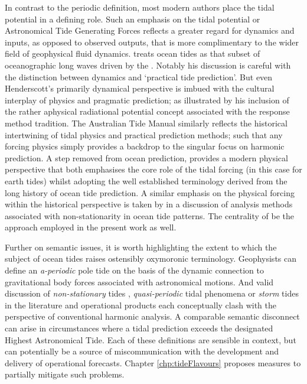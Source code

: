 In contrast to the periodic definition, most modern authors place the tidal potential in a defining role. Such an emphasis on the tidal potential or Astronomical Tide Generating Forces \ATGP{} reflects a greater regard for dynamics and inputs, as opposed to observed outputs, that is more complimentary to the wider field of geophysical fluid dynamics.  
\cite{Hendershott:1981ub} treats ocean tides as that subset of oceanographic long waves driven by the \ATGP{}.  Notably his discussion is careful with the distinction between dynamics and `practical tide prediction'. But even Henderscott's primarily dynamical perspective is imbued with the cultural interplay of physics and pragmatic prediction; as illustrated by his inclusion of the rather aphysical radiational potential concept associated with the \cite{Munk:1966ts} response method tradition.
The Australian Tide Manual \cite{PCTMSL-sp9} similarly reflects the historical intertwining of tidal physics and practical prediction methods; such that any forcing physics simply provides a backdrop to the singular focus on harmonic prediction.   
A step removed from ocean prediction, \cite{10.1016/b978-0-444-53802-4.00058-0} provides a modern physical perspective that both emphasises the core role of the tidal forcing (in this case for earth tides) whilst adopting the well established terminology derived from the long history of ocean tide prediction. A similar emphasis on the physical forcing within the historical perspective is taken by \citep{Flinchem:2000kp} in a  discussion of analysis methods associated with non-stationarity in ocean tide patterns.
The centrality of \ATGP{} be the approach employed in the present work as well.


Further on semantic issues, it is worth highlighting the extent to which the subject of ocean tides raises ostensibly oxymoronic terminology.  
Geophysists can define an \emph{a-periodic} pole tide on the basis of the dynamic connection to gravitational body forces associated with astronomical motions.   And valid discussion of \emph{non-stationary} tides \cite{Ray:2011tj}, \emph{quasi-periodic} tidal phenomena \citep{Flinchem:2000kp} or \emph{storm} tides \cite{Horsburgh:2008gw} in the literature and operational products each conceptually clash with the perspective of conventional harmonic analysis.  
A comparable semantic disconnect can arise in circumstances where a tidal prediction exceeds the designated Highest Astronomical Tide.   
Each of these definitions are sensible in context, but can potentially be a source of miscommunication with the development and delivery of operational forecasts.    Chapter \ref{chp:tideFlavours} proposes measures to partially mitigate such problems.

